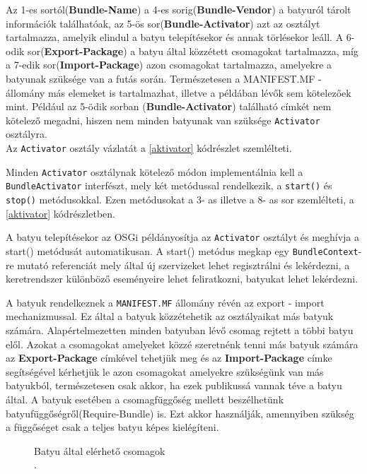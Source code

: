 Az 1-es sortól(\textbf{Bundle-Name}) a 4-es sorig(\textbf{Bundle-Vendor}) a batyuról tárolt információk találhatóak, az 5-ös sor(\textbf{Bundle-Activator}) azt az osztályt tartalmazza, amelyik elindul a batyu telepítésekor és annak törlésekor leáll. A 6-odik sor(\textbf{Export-Package}) a batyu által közzétett csomagokat tartalmazza, míg a 7-edik sor(\textbf{Import-Package}) azon csomagokat tartalmazza, amelyekre a batyunak szüksége van a futás során. Természetesen a MANIFEST.MF - állomány más elemeket is tartalmazhat, illetve a példában lévők sem kötelezőek mint. Például az  5-ödik sorban (\textbf{Bundle-Activator}) található címkét nem kötelező megadni, hiszen nem minden batyunak van szüksége \texttt{Activator} osztályra. \\ Az \texttt{Activator} osztály vázlatát a \ref{aktivator} kódrészlet szemlélteti.
\
%


Minden \texttt{Activator} osztálynak kötelező módon implementálnia kell a \texttt{BundleActivator} interfészt, mely két metódussal rendelkezik, a \texttt{start()} és \texttt{stop()} metódusokkal. Ezen metódusokat a 3- as illetve a 8- as sor szemlélteti, a \ref{aktivator} kódrészletben.

A batyu telepítésekor az OSGi példányosítja az \texttt{Activator} osztályt és meghívja a start() metódusát automatikusan. A start() metódus megkap egy \texttt{BundleContext}- re mutató referenciát mely által új szervizeket lehet regisztrálni és lekérdezni, a keretrendszer különböző eseményeire lehet feliratkozni, batyukat lehet lekérdezni.


A batyuk rendelkeznek a \texttt{MANIFEST.MF} állomány révén az export - import mechanizmussal. Ez által a batyuk közzétehetik az osztályaikat más batyuk számára. Alapértelmezetten minden batyuban lévő csomag rejtett a többi batyu elől. Azokat a csomagokat amelyeket közzé szeretnénk tenni más batyuk számára az \textbf{Export-Package} címkével tehetjük meg és az \textbf{Import-Package} címke segítségével kérhetjük le azon csomagokat amelyekre szükségünk van más batyukból, természetesen csak akkor, ha ezek publikussá vannak téve a batyu által. A batyuk esetében a csomagfüggőség mellett beszélhetünk batyufüggőségről(Require-Bundle) is. Ezt akkor használják, amennyiben szükség a függőséget csak a teljes batyu képes kielégíteni.


\begin{figure}[h!]
  \centering
  \caption[Batyuk elerese]%
  {Batyu által elérhető csomagok\\
  {\white .}\hfill\url{}}
  \label{fig:BatyukElerese}
\end{figure}

